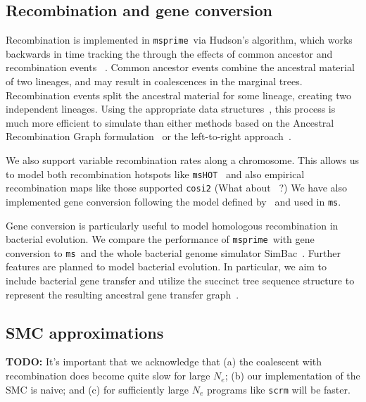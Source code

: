 \documentclass{article}
\newcommand{\msprime}[0]{\texttt{msprime}}
\newcommand{\ms}[0]{\texttt{ms}}
\begin{document}
\subsection*{Recombination and gene conversion}
Recombination is implemented in \msprime\ via
Hudson's algorithm, which
works backwards in time tracking the
through the effects of common ancestor and recombination events
~\citep{hudson1983properties,hudson1990gene,kelleher2016efficient}. Common
ancestor events combine the ancestral material of two lineages, and may
 result in coalescences in the marginal trees. Recombination events
split the ancestral material for some lineage, creating two independent
lineages. Using the appropriate data structures~\citep{kelleher2016efficient},
this process is much more efficient to simulate than either
methods based on the Ancestral Recombination Graph
formulation~\citep{griffiths1991two,griffiths1997ancestral}
or the left-to-right approach~\citep{wiuf1999recombination,wiuf1999ancestry}.


We also support variable recombination rates along a chromosome.
This allows us to model both recombination hotspots like
\texttt{msHOT}~\citep{hellenthal2007mshot} and also empirical
recombination maps like those supported \texttt{cosi2}
\citep{shlyakhter2014cosi2}
(What about ~\cite{wang2014new}?)
We have also implemented gene
conversion following the model defined by~\cite{wiuf2000coalescent}
and used in \ms.

Gene conversion is particularly useful to model homologous recombination in bacterial evolution.
We compare the performance of \msprime\ with gene conversion to \ms\ and
the whole bacterial genome simulator SimBac~\citep{brown2016simbac}.
Further features are planned to model bacterial evolution. In particular, we
aim to include bacterial gene transfer and utilize the succinct tree sequence structure
to represent the resulting ancestral gene transfer graph~\citep{baumdicker2014AGTG}.

\subsection*{SMC approximations}

\textbf{TODO:} It's important that we acknowledge that (a) the coalescent
with recombination does become quite slow for large $N_e$; (b) our
implementation of the SMC is naive; and (c) for sufficiently large
$N_e$ programs like \texttt{scrm} will be faster.
\end{document}
